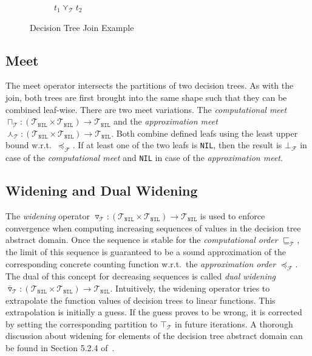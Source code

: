 \documentclass[11pt,a4paper,titlepage]{article}
\theoremstyle{definition}
\begin{document}
\begin{figure}
\begin{subfigure}[b]{0.5\textwidth}
        \caption{$t_1 \curlyvee_{\mathcal{T}} t_2$}
    \end{subfigure}

    \caption{Decision Tree Join Example}
    \label{fig:decision_tree_join_example}
\end{figure}


\subsection{Meet}\label{sec:tree_meet}
The meet operator intersects the partitions of two decision trees. As with the join, both trees are first
brought into the same shape such that they can be combined leaf-wise. There are two meet variations. 
The \textit{computational meet} $\sqcap_\mathcal{T} \colon (\mathcal{T}_\mathtt{NIL} \times \mathcal{T}_\mathtt{NIL}) \rightarrow \mathcal{T}_\mathtt{NIL}$
and the \textit{approximation meet} $\curlywedge_\mathcal{T} \colon (\mathcal{T}_\mathtt{NIL} \times \mathcal{T}_\mathtt{NIL}) \rightarrow \mathcal{T}_\mathtt{NIL}$. 
Both combine defined leafs using the least upper bound w.r.t.\ $\preceq_{\mathcal{F}}$. 
If at least one of the two leafs is \texttt{NIL}, then the result is $\bot_\mathcal{F}$ in case of the 
\textit{computational meet} and \texttt{NIL} in case of the \textit{approximation meet}.

\subsection{Widening and Dual Widening}\label{sec:tree_widen}
The \textit{widening} operator $\triangledown_\mathcal{T} \colon (\mathcal{T}_\mathtt{NIL} \times \mathcal{T}_\mathtt{NIL}) \rightarrow \mathcal{T}_\mathtt{NIL}$
is used to enforce convergence when computing increasing sequences of values in the decision tree abstract domain. 
Once the sequence is stable for the \textit{computational order} $\sqsubseteq_\mathcal{T}$, 
the limit of this sequence is guaranteed to be a sound approximation of the corresponding concrete counting function 
w.r.t.\ the \textit{approximation order} $\preceq_{\mathcal{F}}$.
The dual of this concept for decreasing sequences is called \textit{dual widening} 
$\bar\triangledown_\mathcal{T} \colon (\mathcal{T}_\mathtt{NIL} \times \mathcal{T}_\mathtt{NIL}) \rightarrow \mathcal{T}_\mathtt{NIL}$.
Intuitively, the widening operator tries to extrapolate the function values of decision trees to linear functions. This extrapolation is
initially a guess. If the guess proves to be wrong, it is corrected by setting the corresponding partition to $\top_\mathcal{T}$ in future iterations.
A thorough discussion about widening for elements of the decision tree abstract domain can be found in Section 5.2.4 of~\cite{UrbanPhd}.
\end{document}
